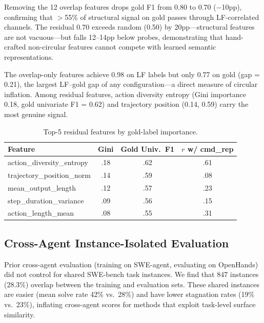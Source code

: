 \documentclass[11pt,a4paper]{article}
\begin{document}
Removing the 12 overlap features drops gold F1 from 0.80 to 0.70 ($-$10pp), confirming that $>$55\% of structural signal on gold passes through LF-correlated channels.
The residual 0.70 exceeds random (0.50) by 20pp---structural features are not vacuous---but falls 12--14pp below probes, demonstrating that hand-crafted non-circular features cannot compete with learned semantic representations.

The overlap-only features achieve 0.98 on LF labels but only 0.77 on gold (gap = 0.21), the largest LF--gold gap of any configuration---a direct measure of circular inflation.
Among residual features, action diversity entropy (Gini importance 0.18, gold univariate F1 = 0.62) and trajectory position (0.14, 0.59) carry the most genuine signal.

\begin{table}[t]
\centering
\small
\caption{Top-5 residual features by gold-label importance.}
\label{tab:residual}
\begin{tabular}{lccc}
\toprule
\textbf{Feature} & \textbf{Gini} & \textbf{Gold Univ.\ F1} & \textbf{$r$ w/ cmd\_rep} \\
\midrule
action\_diversity\_entropy & .18 & .62 & .61 \\
trajectory\_position\_norm & .14 & .59 & .08 \\
mean\_output\_length       & .12 & .57 & .23 \\
step\_duration\_variance   & .09 & .56 & .15 \\
action\_length\_mean       & .08 & .55 & .31 \\
\bottomrule
\end{tabular}
\end{table}

\subsection{Cross-Agent Instance-Isolated Evaluation}
\label{sec:isolation}

Prior cross-agent evaluation (training on SWE-agent, evaluating on OpenHands) did not control for shared SWE-bench task instances.
We find that 847 instances (28.3\%) overlap between the training and evaluation sets.
These shared instances are easier (mean solve rate 42\% vs.\ 28\%) and have lower stagnation rates (19\% vs.\ 23\%), inflating cross-agent scores for methods that exploit task-level surface similarity.
\end{document}
